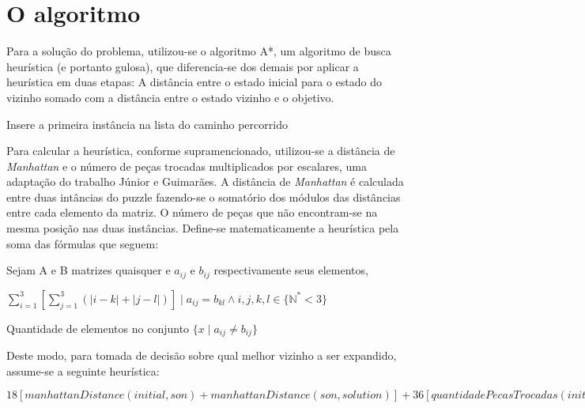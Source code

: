 \documentclass[12pt]{article}
\begin{document}
	\section{O algoritmo}\label{sec:algoritmo}

		Para a solução do problema, utilizou-se o algoritmo A*, um algoritmo de busca heurística (e portanto gulosa), que diferencia-se dos demais por aplicar a heurística em duas etapas: A distância entre o estado inicial para o estado do vizinho somado com a distância entre o estado vizinho e o objetivo.

		\begin{algorithm}[H]
			Insere a primeira instância na lista do caminho percorrido\;
			\caption{Busca A* para resolver 8-Puzzle}
		\end{algorithm}

		Para calcular a heurística, conforme supramencionado, utilizou-se a distância de \textit{Manhattan} e o número de peças trocadas multiplicados por escalares, uma adaptação do trabalho Júnior e Guimarães. A distância de \textit{Manhattan} é calculada entre duas intâncias do puzzle fazendo-se o somatório dos módulos das distâncias entre cada elemento da matriz. O número de peças que não encontram-se na mesma posição nas duas instâncias. Define-se matematicamente a heurística pela soma das fórmulas que seguem:

		\noindent Sejam A e B matrizes quaisquer e $a_{ij}$ e $b_{ij}$ respectivamente seus elementos,

		\quad\quad $\sum_{i=1}^{3}[\sum_{j=1}^{3}(|i-k| + |j-l|)] \mid a_{ij}=b_{kl} \wedge i,j,k,l \in \{\mathbb{N^*} < 3\}$

		\quad\quad Quantidade de elementos no conjunto $\{x \mid a_{ij} \neq b_{ij}\}$

		Deste modo, para tomada de decisão sobre qual melhor vizinho a ser expandido, assume-se a seguinte heurística:

		\begin{center}
		$18[manhattanDistance(initial, son) + manhattanDistance(son, solution)] +
		36[quantidadePecasTrocadas(initial, son) + quantidadePecasTrocadas(son, solution)]$
		\end{center}
\end{document}
